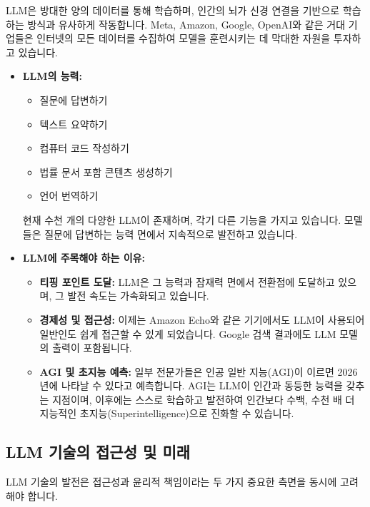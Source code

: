\documentclass[11pt,a4paper]{article}
\begin{document}
LLM은 방대한 양의 데이터를 통해 학습하며, 인간의 뇌가 신경 연결을 기반으로 학습하는 방식과 유사하게 작동합니다. Meta, Amazon, Google, OpenAI와 같은 거대 기업들은 인터넷의 모든 데이터를 수집하여 모델을 훈련시키는 데 막대한 자원을 투자하고 있습니다.

\begin{itemize}
    \item \textbf{LLM의 능력:}
    \begin{itemize}
        \item 질문에 답변하기
        \item 텍스트 요약하기
        \item 컴퓨터 코드 작성하기
        \item 법률 문서 포함 콘텐츠 생성하기
        \item 언어 번역하기
    \end{itemize}
    현재 수천 개의 다양한 LLM이 존재하며, 각기 다른 기능을 가지고 있습니다. 모델들은 질문에 답변하는 능력 면에서 지속적으로 발전하고 있습니다.

    \item \textbf{LLM에 주목해야 하는 이유:}
    \begin{itemize}
        \item \textbf{티핑 포인트 도달:} LLM은 그 능력과 잠재력 면에서 전환점에 도달하고 있으며, 그 발전 속도는 가속화되고 있습니다.
        \item \textbf{경제성 및 접근성:} 이제는 Amazon Echo와 같은 기기에서도 LLM이 사용되어 일반인도 쉽게 접근할 수 있게 되었습니다. Google 검색 결과에도 LLM 모델의 출력이 포함됩니다.
        \item \textbf{AGI 및 초지능 예측:} 일부 전문가들은 인공 일반 지능(AGI)이 이르면 2026년에 나타날 수 있다고 예측합니다. AGI는 LLM이 인간과 동등한 능력을 갖추는 지점이며, 이후에는 스스로 학습하고 발전하여 인간보다 수백, 수천 배 더 지능적인 초지능(Superintelligence)으로 진화할 수 있습니다.
    \end{itemize}
\end{itemize}

\subsection{LLM 기술의 접근성 및 미래}

LLM 기술의 발전은 접근성과 윤리적 책임이라는 두 가지 중요한 측면을 동시에 고려해야 합니다.
\end{document}
